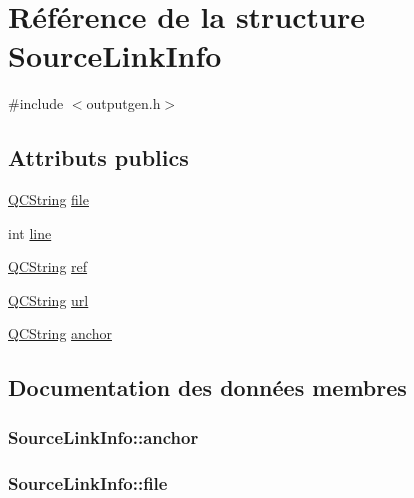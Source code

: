 \hypertarget{struct_source_link_info}{}\section{Référence de la structure Source\+Link\+Info}
\label{struct_source_link_info}


{\ttfamily \#include $<$outputgen.\+h$>$}

\subsection*{Attributs publics}
\begin{DoxyCompactItemize}
\item 
\hyperlink{class_q_c_string}{Q\+C\+String} \hyperlink{struct_source_link_info_a17c887dc311b8da42681dc4e9803692d}{file}
\item 
int \hyperlink{struct_source_link_info_abff71a239d4a657ea1543c0426b5726c}{line}
\item 
\hyperlink{class_q_c_string}{Q\+C\+String} \hyperlink{struct_source_link_info_a53631fa171fa05192c059087d66278c0}{ref}
\item 
\hyperlink{class_q_c_string}{Q\+C\+String} \hyperlink{struct_source_link_info_af1fd0f6d7c9418bf922d33d591d7f196}{url}
\item 
\hyperlink{class_q_c_string}{Q\+C\+String} \hyperlink{struct_source_link_info_a3a271e40098bce60ea2d71f452be7fa6}{anchor}
\end{DoxyCompactItemize}


\subsection{Documentation des données membres}
\hypertarget{struct_source_link_info_a3a271e40098bce60ea2d71f452be7fa6}{}
\subsubsection[{anchor}]{ Source\+Link\+Info\+::anchor}\label{struct_source_link_info_a3a271e40098bce60ea2d71f452be7fa6}
\hypertarget{struct_source_link_info_a17c887dc311b8da42681dc4e9803692d}{}
\subsubsection[{file}]{ Source\+Link\+Info\+::file}\label{struct_source_link_info_a17c887dc311b8da42681dc4e9803692d}
\hypertarget{struct_source_link_info_abff71a239d4a657ea1543c0426b5726c}{}
